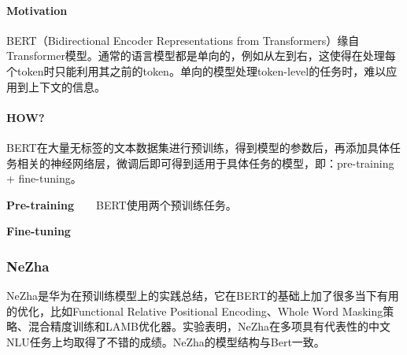 \paragraph{Motivation}
BERT（Bidirectional Encoder Representations from Transformers）\cite{devlin2019bert}缘自Transformer模型。通常的语言模型都是单向的，例如从左到右，这使得在处理每个token时只能利用其之前的token。单向的模型处理token-level的任务时，难以应用到上下文的信息。

\paragraph{HOW?}
BERT在大量无标签的文本数据集进行预训练，得到模型的参数后，再添加具体任务相关的神经网络层，微调后即可得到适用于具体任务的模型，即：pre-training + fine-tuning。

\par{\textbf{Pre-training}}\ \ \ \ BERT使用两个预训练任务。

\par{\textbf{Fine-tuning}}


\subsubsection{NeZha}
NeZha\cite{junqiu2019nezha}是华为在预训练模型上的实践总结，它在BERT的基础上加了很多当下有用的优化，比如Functional Relative Positional Encoding、Whole Word Masking策略、混合精度训练和LAMB优化器。实验表明，NeZha在多项具有代表性的中文NLU任务上均取得了不错的成绩。NeZha的模型结构与Bert一致。
